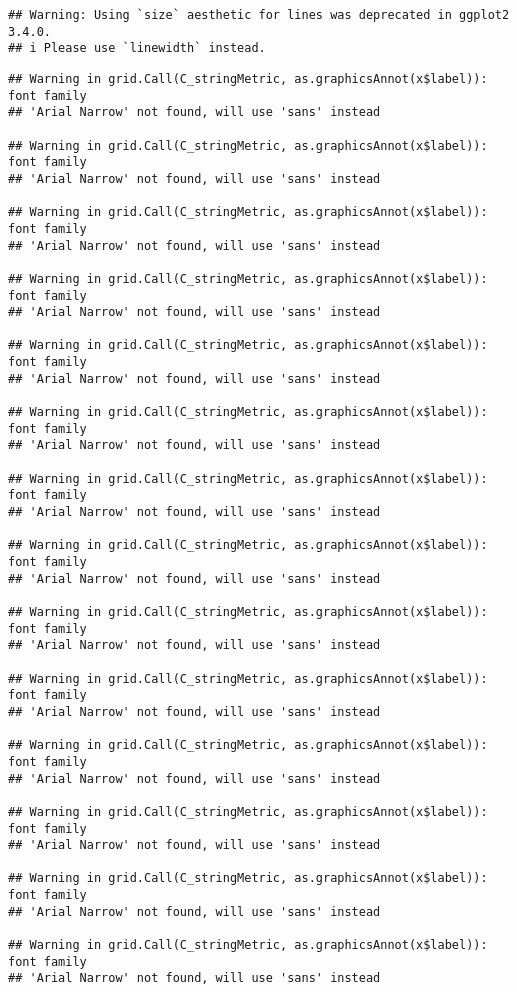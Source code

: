 \documentclass[
]{article}
\begin{document}
\begin{verbatim}
## Warning: Using `size` aesthetic for lines was deprecated in ggplot2 3.4.0.
## i Please use `linewidth` instead.
\end{verbatim}

\begin{verbatim}
## Warning in grid.Call(C_stringMetric, as.graphicsAnnot(x$label)): font family
## 'Arial Narrow' not found, will use 'sans' instead

## Warning in grid.Call(C_stringMetric, as.graphicsAnnot(x$label)): font family
## 'Arial Narrow' not found, will use 'sans' instead

## Warning in grid.Call(C_stringMetric, as.graphicsAnnot(x$label)): font family
## 'Arial Narrow' not found, will use 'sans' instead

## Warning in grid.Call(C_stringMetric, as.graphicsAnnot(x$label)): font family
## 'Arial Narrow' not found, will use 'sans' instead

## Warning in grid.Call(C_stringMetric, as.graphicsAnnot(x$label)): font family
## 'Arial Narrow' not found, will use 'sans' instead

## Warning in grid.Call(C_stringMetric, as.graphicsAnnot(x$label)): font family
## 'Arial Narrow' not found, will use 'sans' instead

## Warning in grid.Call(C_stringMetric, as.graphicsAnnot(x$label)): font family
## 'Arial Narrow' not found, will use 'sans' instead

## Warning in grid.Call(C_stringMetric, as.graphicsAnnot(x$label)): font family
## 'Arial Narrow' not found, will use 'sans' instead

## Warning in grid.Call(C_stringMetric, as.graphicsAnnot(x$label)): font family
## 'Arial Narrow' not found, will use 'sans' instead

## Warning in grid.Call(C_stringMetric, as.graphicsAnnot(x$label)): font family
## 'Arial Narrow' not found, will use 'sans' instead

## Warning in grid.Call(C_stringMetric, as.graphicsAnnot(x$label)): font family
## 'Arial Narrow' not found, will use 'sans' instead

## Warning in grid.Call(C_stringMetric, as.graphicsAnnot(x$label)): font family
## 'Arial Narrow' not found, will use 'sans' instead

## Warning in grid.Call(C_stringMetric, as.graphicsAnnot(x$label)): font family
## 'Arial Narrow' not found, will use 'sans' instead

## Warning in grid.Call(C_stringMetric, as.graphicsAnnot(x$label)): font family
## 'Arial Narrow' not found, will use 'sans' instead


\end{verbatim}
\end{document}

